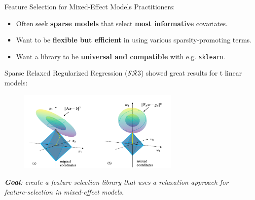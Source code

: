 \documentclass[8pt]{beamer}
\begin{document}
\begin{frame}{Feature Selection for Mixed-Effect Models}
Practitioners:
\begin{itemize}
	\item Often seek \textbf{sparse models} that select \textbf{most informative} covariates. 
	\item Want to be \textbf{flexible but efficient} in using various sparsity-promoting terms.
	\item Want a library to be \textbf{universal and compatible} with e.g. \texttt{sklearn}.
\end{itemize}
\vspace{1em}

Sparse Relaxed Regularized Regression ($\mathcal{SR}3$) \cite{Zheng2018RelaxAndSplit} showed great results for t linear models:

\begin{figure}
	\includegraphics[width=0.7\textwidth]{Figures/intuition_prev_paper.png}
\end{figure}

\vspace{1em}
\textit{\textbf{Goal}: create a feature selection library that uses a relaxation approach for feature-selection in mixed-effect models.}

\end{frame}
\end{document}
